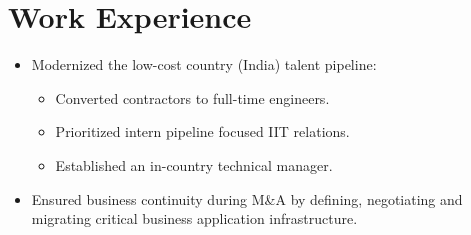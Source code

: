 \section{Work Experience}


\begin{itemize}
	\item Modernized the low-cost country (India) talent pipeline:
	\vspace{-\topsep} %
	\begin{itemize}
		\item Converted contractors to full-time engineers.
		\item Prioritized intern pipeline focused IIT relations.
		\item Established an in-country technical manager.
	\end{itemize}
	\vspace{-\topsep} %
	\item Ensured business continuity during M\&A by defining, negotiating and migrating critical business application infrastructure.
\end{itemize}
\sectionsep


